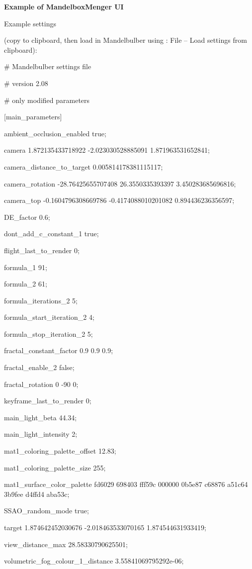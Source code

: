 \textbf{Example of MandelboxMenger UI}

Example settings

(copy to clipboard, then load in Mandelbulber using : File -- Load
settings from clipboard):

\# Mandelbulber settings file

\# version 2.08

\# only modified parameters

{[}main\_parameters{]}

ambient\_occlusion\_enabled true;

camera 1.872135433718922 -2.023030528885091 1.871963531652841;

camera\_distance\_to\_target 0.005814178381115117;

camera\_rotation -28.76425655707408 26.3550335393397 3.450283685696816;

camera\_top -0.1604796308669786 -0.4174088010201082 0.894436236356597;

DE\_factor 0.6;

dont\_add\_c\_constant\_1 true;

flight\_last\_to\_render 0;

formula\_1 91;

formula\_2 61;

formula\_iterations\_2 5;

formula\_start\_iteration\_2 4;

formula\_stop\_iteration\_2 5;

fractal\_constant\_factor 0.9 0.9 0.9;

fractal\_enable\_2 false;

fractal\_rotation 0 -90 0;

keyframe\_last\_to\_render 0;

main\_light\_beta 44.34;

main\_light\_intensity 2;

mat1\_coloring\_palette\_offset 12.83;

mat1\_coloring\_palette\_size 255;

mat1\_surface\_color\_palette fd6029 698403 fff59c 000000 0b5e87 c68876
a51c64 3b9fee d4ffd4 aba53c;

SSAO\_random\_mode true;

target 1.874642452030676 -2.018463533070165 1.874544631933419;

view\_distance\_max 28.58330790625501;

volumetric\_fog\_colour\_1\_distance 3.55841069795292e-06;

